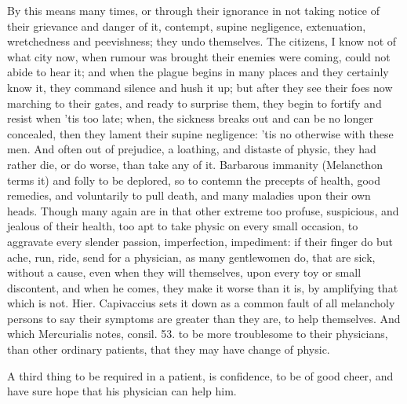 {By this means many times, or through their ignorance in not taking
notice of their grievance and danger of it, contempt, supine
negligence, extenuation, wretchedness and peevishness; they undo
themselves. The citizens, I know not of what city now, when rumour was
brought their enemies were coming, could not abide to hear it; and when
the plague begins in many places and they certainly know it, they
command silence and hush it up; but after they see their foes now
marching to their gates, and ready to surprise them, they begin to
fortify and resist when 'tis too late; when, the sickness breaks out
and can be no longer concealed, then they lament their supine
negligence: 'tis no otherwise with these men. And often out of
prejudice, a loathing, and distaste of physic, they had rather die, or
do worse, than take any of it. Barbarous immanity (Melancthon
terms it) and folly to be deplored, so to contemn the precepts of
health, good remedies, and voluntarily to pull death, and many maladies
upon their own heads. Though many again are in that other extreme too
profuse, suspicious, and jealous of their health, too apt to take
physic on every small occasion, to aggravate every slender passion,
imperfection, impediment: if their finger do but ache, run, ride, send
for a physician, as many gentlewomen do, that are sick, without a
cause, even when they will themselves, upon every toy or small
discontent, and when he comes, they make it worse than it is, by
amplifying that which is not. Hier. Capivaccius sets it down as a
common fault of all melancholy persons to say their symptoms are
greater than they are, to help themselves. And which Mercurialis
notes, consil. 53. to be more troublesome to their physicians, than
other ordinary patients, that they may have change of physic.

A third thing to be required in a patient, is confidence, to be of good
cheer, and have sure hope that his physician can help him.

}
